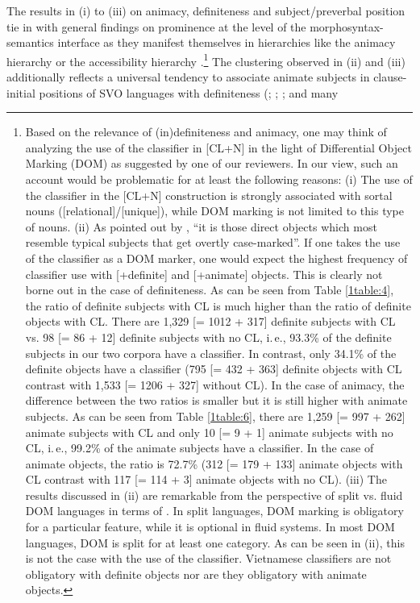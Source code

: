 \documentclass[output=paper]{langsci/langscibook}
\begin{document}
The results in (i) to (iii) on animacy, definiteness and subject/preverbal position tie in with general findings on prominence at the level of the morphosyntax-semantics interface as they manifest themselves in hierarchies like the animacy hierarchy \citep{silverstein:76,dixon:79} or the accessibility hierarchy \citep{keenan:comrie:77} \citep[for a survey, cf.][]{bornkessel:schlesewsky:09}.\footnote{Based on the relevance of (in)definiteness and animacy, one may think of analyzing the use of the classifier in [CL+N] in the light of Differential Object Marking (DOM) as suggested by one of our reviewers. In our view, such an account would be problematic for at least the following reasons: (i) The use of the classifier in the [CL+N] construction is strongly associated with sortal nouns ([\minus relational]/[\minus unique]), while DOM marking is not limited to this type of nouns. (ii) As pointed out by \cite[][439]{aissen:03}, ``it is those direct objects which most resemble typical subjects that get overtly case-marked''. If one takes the use of the classifier as a DOM marker, one would expect the highest frequency of classifier use with [+definite] and [+animate] objects. This is clearly not borne out in the case of definiteness. As can be seen from Table \ref{1table:4}, the ratio of definite subjects with CL is much higher than the ratio of definite objects with CL. There are 1,329 [= 1012 + 317] definite subjects with CL vs. 98 [= 86 + 12] definite subjects with no CL, i.\,e., 93.3\% of the definite subjects in our two corpora have a classifier. In contrast, only 34.1\% of the definite objects have a classifier (795 [= 432 + 363] definite objects with CL contrast with 1,533 [= 1206 + 327] without CL). In the case of animacy, the difference between the two ratios is smaller but it is still higher with animate subjects. As can be seen from Table \ref{1table:6}, there are 1,259 [= 997 + 262] animate subjects with CL and only 10 [= 9 + 1] animate subjects with no CL, i.\,e., 99.2\% of the animate subjects have a classifier. In the case of animate objects, the ratio is 72.7\% (312 [= 179 + 133] animate objects with CL contrast with 117 [= 114 + 3] animate objects with no CL). (iii) The results discussed in (ii) are remarkable from the perspective of split vs. fluid DOM languages in terms of \cite{dehoop:malchukov:07}. In split languages, DOM marking is obligatory for a particular feature, while it is optional in fluid systems. In most DOM languages, DOM is split for at least one category. As can be seen in (ii), this is not the case with the use of the classifier. Vietnamese classifiers are not obligatory with definite objects nor are they obligatory with animate objects.} The clustering observed in (ii) and (iii) additionally reflects a universal tendency to associate animate subjects in clause-initial positions of SVO languages with definiteness (\citealt{keenan:comrie:77}; \citealt{givon:79}; \citealt{dubois:87}; and many 
\end{document}
